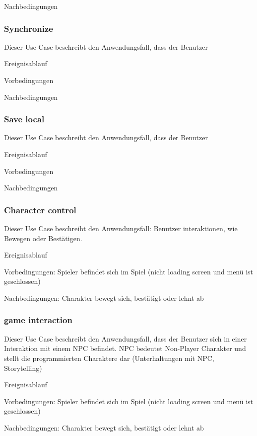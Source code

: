 			{Nachbedingungen
	
		\subsubsection{Synchronize}
			Dieser Use Case beschreibt den Anwendungsfall, dass der Benutzer 
			
			Ereignisablauf
	
			Vorbedingungen
			
			Nachbedingungen
	
		\subsubsection{Save local}
			Dieser Use Case beschreibt den Anwendungsfall, dass der Benutzer 
			
			Ereignisablauf
	
			Vorbedingungen
			
			Nachbedingungen
		
		\subsubsection{Character control}
			Dieser Use Case beschreibt den Anwendungsfall: Benutzer interaktionen, wie Bewegen oder Bestätigen.
			
			Ereignisablauf
			
			Vorbedingungen: Spieler befindet sich im Spiel (nicht loading screen und menü ist geschlossen)
			
			Nachbedingungen: Charakter bewegt sich, bestätigt oder lehnt ab
	
		\subsubsection{game interaction}
			Dieser Use Case beschreibt den Anwendungsfall, dass der Benutzer sich in einer Interaktion mit einem NPC befindet. NPC bedeutet Non-Player Charakter und stellt die programmierten Charaktere dar (Unterhaltungen mit NPC, Storytelling)
			
			Ereignisablauf
			
			Vorbedingungen: Spieler befindet sich im Spiel (nicht loading screen und menü ist geschlossen)
			
			Nachbedingungen: Charakter bewegt sich, bestätigt oder lehnt ab
				
	
}
